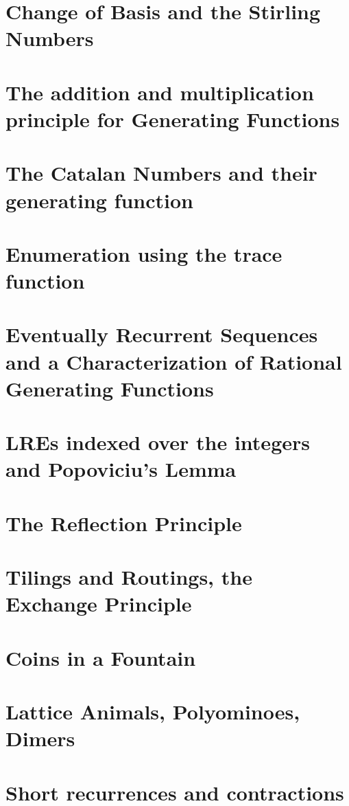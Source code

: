\section{Change of Basis and the Stirling Numbers}

\section{The addition and multiplication principle for Generating Functions}

\section{The Catalan Numbers and their generating function}

\section{Enumeration using the trace function}

\section{Eventually Recurrent Sequences and a Characterization of Rational Generating Functions}

\section{LREs indexed over the integers and Popoviciu's Lemma}

\section{The Reflection Principle}

\section{Tilings and Routings, the Exchange Principle}

\section{Coins in a Fountain}

\section{Lattice Animals, Polyominoes, Dimers}

\section{Short recurrences and contractions}

